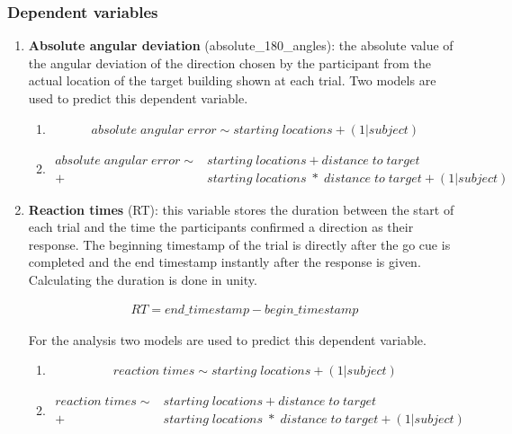 \subsubsection{Dependent variables}

\begin{enumerate}
	\item \textbf{Absolute angular deviation} {\emphasize (absolute\_180\_angles)}: the absolute value of the angular deviation of the direction chosen by the participant from the actual location of the target building shown at each trial. Two models are used to predict this dependent variable. \\
	
	\begin{enumerate}
		\item
		\begin{align*}
			absolute \; angular \; error \sim starting \; locations + (1 | subject)
		\end{align*}
	
		\item 
		\begin{align*}
			absolute \; angular \; error \sim &starting \; locations + distance \; to \; target \\
			+ &starting \; locations \; * \; distance \; to \; target + (1 | subject)
		\end{align*}
	\end{enumerate}
	

	\item \textbf{Reaction times} {\emphasize (RT)}: this variable stores the duration between the start of each trial and the time the participants confirmed a direction as their response. The beginning timestamp of the trial is directly after the go cue is completed and the end timestamp instantly after the response is given. Calculating the duration is done in unity. 
	
	\begin{align*}
		RT = end\_timestamp - begin\_timestamp
	\end{align*}

	 For the analysis two models are used to predict this dependent variable.\\
	 
	 
	 \begin{enumerate}
	 	\item
	 	\begin{align*}
	 		reaction \; times \sim starting \; locations + (1 | subject)
	 	\end{align*}
	 	
	 	\item 
	 	\begin{align*}
	 		reaction \; times \sim &starting \; locations + distance \; to \; target \\
	 		+ &starting \; locations \; * \; distance \; to \; target + (1 | subject)
	 	\end{align*}
	 \end{enumerate}
 
\end{enumerate}





